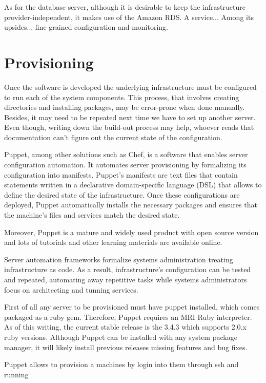 As for the database server, although it is desirable to keep the infrastructure provider-independent, it makes use of the Amazon RDS. A service... Among its upsides... fine-grained configuration and monitoring.

\section{Provisioning}

Once the software is developed the underlying infrastructure must be configured to run each of the system components. This process, that involves creating directories and installing packages, may be error-prone when done manually. Besides, it may need to be repeated next time we have to set up another server. Even though, writing down the build-out process may help, whoever reads that documentation can't figure out the current state of the configuration.

Puppet, among other solutions such as Chef, is a software that enables server configuration automation. It automates server provisioning by formalizing its configuration into manifests. Puppet's manifests are text files that contain statements written in a declarative domain-specific language (DSL) that allows to define the desired state of the infrastructure. Once these configurations are deployed, Puppet automatically installs the necessary packages and ensures that the machine’s files and services match the desired state.

Moreover, Puppet is a mature and widely used product with open source version and lots of tutorials and other learning materials are available online.

Server automation frameworks formalize systems administration treating infrastructure as code. As a result, infrastructure's configuration can be tested and repeated, automating away repetitive tasks while systems administrators focus on architecting and tunning services.

First of all any server to be provisioned must have puppet installed, which comes packaged as a ruby gem. Therefore, Puppet requires an MRI Ruby interpreter. As of this writing, the current stable release is the 3.4.3 which supports 2.0.x ruby versions. Although Puppet can be installed with any system package manager, it will likely install previous releases missing features and bug fixes.

Puppet allows to provision a machines by login into them through ssh and running

